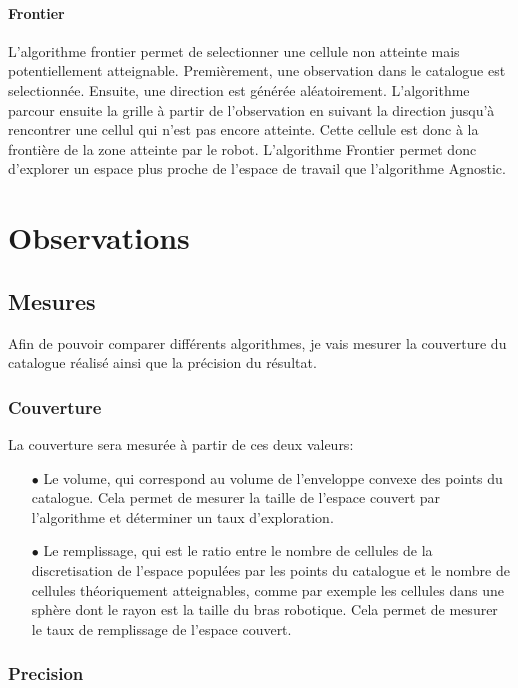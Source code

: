 \documentclass[11pt,french]{report}
\begin{document}
\subsubsection{Frontier}

L'algorithme frontier permet de selectionner une cellule non atteinte mais potentiellement atteignable. Premièrement, une observation dans le catalogue est selectionnée. Ensuite, une direction est générée aléatoirement. L'algorithme parcour ensuite la grille à partir de l'observation en suivant la direction jusqu'à rencontrer une cellul qui n'est pas encore atteinte. Cette cellule est donc à la frontière de la zone atteinte par le robot. L'algorithme Frontier permet donc d'explorer un espace plus proche de l'espace de travail que l'algorithme Agnostic.


\chapter{Observations}

\section{Mesures}

Afin de pouvoir comparer différents algorithmes, je vais mesurer la couverture du catalogue réalisé ainsi que la précision du résultat.

\subsection{Couverture}

La couverture sera mesurée à partir de ces deux valeurs:

\begin{itemize}
    \item[$\bullet$] Le volume, qui correspond au volume de l'enveloppe convexe des points du catalogue. Cela permet de mesurer la taille de l'espace couvert par l'algorithme et déterminer un taux d'exploration.
    \item[$\bullet$] Le remplissage, qui est le ratio entre le nombre de cellules de la discretisation de l'espace populées par les points du catalogue et le nombre de cellules théoriquement atteignables, comme par exemple les cellules dans une sphère dont le rayon est la taille du bras robotique. Cela permet de mesurer le taux de remplissage de l'espace couvert.
\end{itemize}

\subsection{Precision}
\end{document}
